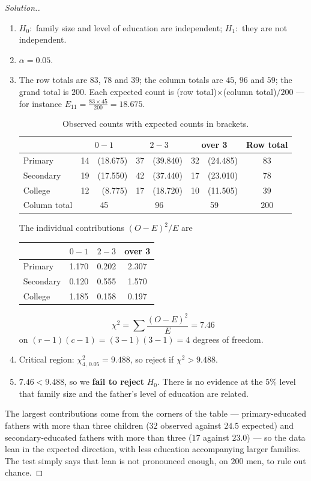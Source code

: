 \documentclass[11pt,a4paper]{article}
\theoremstyle{definition}
\newenvironment{solution}
  {\renewcommand{\qedsymbol}{}\begin{proof}[\textit{Solution}.]}
  {\end{proof}}
\begin{document}
\begin{solution}
\begin{enumerate}
\item $H_0:$ family size and level of education are independent;
$H_1:$ they are not independent.
\item $\alpha=0.05$.
\item The row totals are $83$, $78$ and $39$; the column totals are $45$, $96$ and $59$;
the grand total is $200$. Each expected count is (row total)$\times$(column
total)$/200$ --- for instance $E_{11}=\frac{83\times 45}{200}=18.675$.
\begin{table}[H]
\centering
\begin{tabular}{l|ccc|c}
& $0-1$ & $2-3$ & over 3 & Row total\\
\hline
Primary & 14\ \ (18.675) & 37\ \ (39.840) & 32\ \ (24.485) & 83\\
Secondary & 19\ \ (17.550) & 42\ \ (37.440) & 17\ \ (23.010) & 78\\
College & 12\ \ \ (8.775) & 17\ \ (18.720) & 10\ \ (11.505) & 39\\
\hline
Column total & 45 & 96 & 59 & 200\\
\end{tabular}
\caption{Observed counts with expected counts in brackets.}
\end{table}
The individual contributions $(O-E)^2/E$ are
\begin{table}[H]
\centering
\begin{tabular}{l|ccc}
& $0-1$ & $2-3$ & over 3\\
\hline
Primary & 1.170 & 0.202 & 2.307\\
Secondary & 0.120 & 0.555 & 1.570\\
College & 1.185 & 0.158 & 0.197\\
\end{tabular}
\end{table}
\[\chi^2=\sum\frac{(O-E)^2}{E}=7.46\]
on $(r-1)(c-1)=(3-1)(3-1)=4$ degrees of freedom.
\item Critical region: $\chi^2_{4,\,0.05}=9.488$, so reject if $\chi^2>9.488$.
\item $7.46<9.488$, so we \textbf{fail to reject} $H_0$. There is no evidence at the $5\%$
level that family size and the father's level of education are related.
\end{enumerate}

The largest contributions come from the corners of the table --- primary-educated fathers
with more than three children ($32$ observed against $24.5$ expected) and secondary-educated
fathers with more than three ($17$ against $23.0$) --- so the data lean in the expected
direction, with less education accompanying larger families. The test simply says that lean
is not pronounced enough, on $200$ men, to rule out chance.


\end{solution}
\end{document}
